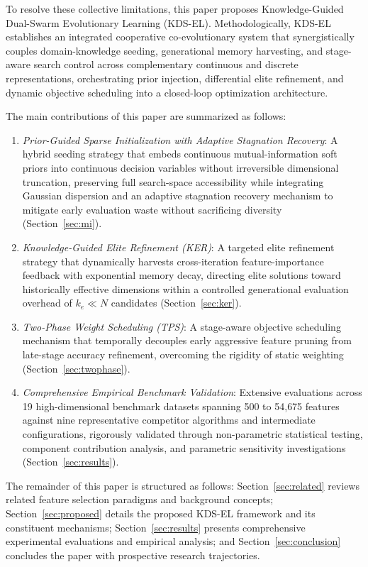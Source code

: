 \documentclass[final,5p,times,fleqn]{elsarticle}
\begin{document}
To resolve these collective limitations, this paper proposes Knowledge-Guided Dual-Swarm Evolutionary Learning (KDS-EL). Methodologically, KDS-EL establishes an integrated cooperative co-evolutionary system that synergistically couples domain-knowledge seeding, generational memory harvesting, and stage-aware search control across complementary continuous and discrete representations, orchestrating prior injection, differential elite refinement, and dynamic objective scheduling into a closed-loop optimization architecture.

The main contributions of this paper are summarized as follows:
\begin{enumerate}
\item \textit{Prior-Guided Sparse Initialization with Adaptive Stagnation Recovery}: A hybrid seeding strategy that embeds continuous mutual-information soft priors into continuous decision variables without irreversible dimensional truncation, preserving full search-space accessibility while integrating Gaussian dispersion and an adaptive stagnation recovery mechanism to mitigate early evaluation waste without sacrificing diversity (Section~\ref{sec:mi}).
\item \textit{Knowledge-Guided Elite Refinement (KER)}: A targeted elite refinement strategy that dynamically harvests cross-iteration feature-importance feedback with exponential memory decay, directing elite solutions toward historically effective dimensions within a controlled generational evaluation overhead of $k_e \ll N$ candidates (Section~\ref{sec:ker}).
\item \textit{Two-Phase Weight Scheduling (TPS)}: A stage-aware objective scheduling mechanism that temporally decouples early aggressive feature pruning from late-stage accuracy refinement, overcoming the rigidity of static weighting (Section~\ref{sec:twophase}).
\item \textit{Comprehensive Empirical Benchmark Validation}: Extensive evaluations across 19 high-dimensional benchmark datasets spanning 500 to 54{,}675 features against nine representative competitor algorithms and intermediate configurations, rigorously validated through non-parametric statistical testing, component contribution analysis, and parametric sensitivity investigations (Section~\ref{sec:results}).
\end{enumerate}

The remainder of this paper is structured as follows: Section~\ref{sec:related} reviews related feature selection paradigms and background concepts; Section~\ref{sec:proposed} details the proposed KDS-EL framework and its constituent mechanisms; Section~\ref{sec:results} presents comprehensive experimental evaluations and empirical analysis; and Section~\ref{sec:conclusion} concludes the paper with prospective research trajectories.
\end{document}
